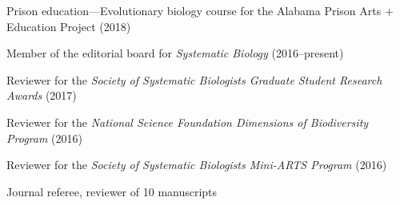 \begin{tightItemize}
    \item Prison education---Evolutionary biology course for the Alabama Prison
        Arts + Education Project (2018)
    \item Member of the editorial board for \emph{Systematic Biology}
            (2016--present)
    \item Reviewer for the \emph{Society of Systematic Biologists Graduate
            Student Research Awards} (2017)
    \item Reviewer for the \emph{National Science Foundation Dimensions of
            Biodiversity Program} (2016)
    \item Reviewer for the \emph{Society of Systematic Biologists Mini-ARTS
            Program} (2016)
    \item Journal referee, reviewer of 10 manuscripts
\end{tightItemize}
